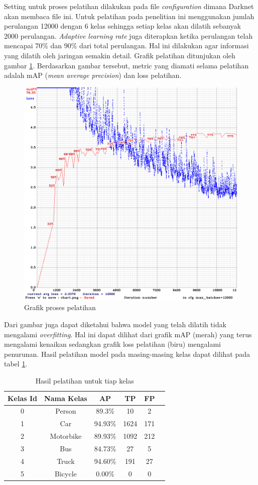 \documentclass[conference]{IEEEtran}
\begin{document}
Setting untuk proses pelatihan dilakukan pada file \textit{configuration} dimana Darknet akan membaca file ini. Untuk pelatihan pada penelitian ini menggunakan jumlah perulangan 12000 dengan 6 kelas sehingga setiap kelas akan dilatih sebanyak 2000 perulangan. 
\textit{Adaptive learning rate} juga diterapkan ketika perulangan telah mencapai 70\% dan 90\% dari total perulangan. Hal ini dilakukan agar informasi yang dilatih oleh jaringan semakin detail. Grafik pelatihan ditunjukan oleh gambar \ref{train_darknet}. Berdasarkan gambar tersebut, metric yang diamati selama pelatihan adalah mAP (\textit{mean average precision}) dan loss pelatihan.
\begin{figure}[htp]
	\centering
	\includegraphics[scale=0.25]{new_full_dataset}
	\caption{Grafik proses pelatihan}
	\label{train_darknet}
\end{figure}
Dari gambar juga dapat diketahui bahwa model yang telah dilatih tidak mengalami \textit{overfitting}. Hal ini dapat dilihat dari grafik mAP (merah) yang terus mengalami kenaikan sedangkan grafik loss pelatihan (biru) mengalami penurunan.
Hasil pelatihan model pada masing-masing kelas dapat dilihat pada tabel \ref{Tabel_training}.
\begin{table}[htp]
\centering
\begin{tabular}{ cccccc }
	\hline 
	Kelas Id & Nama Kelas & AP & TP & FP\\
	\hline
	0& Person & 89.3\% & 10 & 2\\
	1 & Car & 94.93\% & 1624 & 171\\
	2 & Motorbike& 89.93\% &1092& 212 \\
	3 & Bus & 84.73\% & 27& 5 \\
	4 & Truck & 94.60\% & 191 & 27\\
	5 & Bicycle & 0.00\% &0 & 0 \\
\end{tabular}
\caption{Hasil pelatihan untuk tiap kelas}
\label{Tabel_training}
\end{table} 
\end{document}
